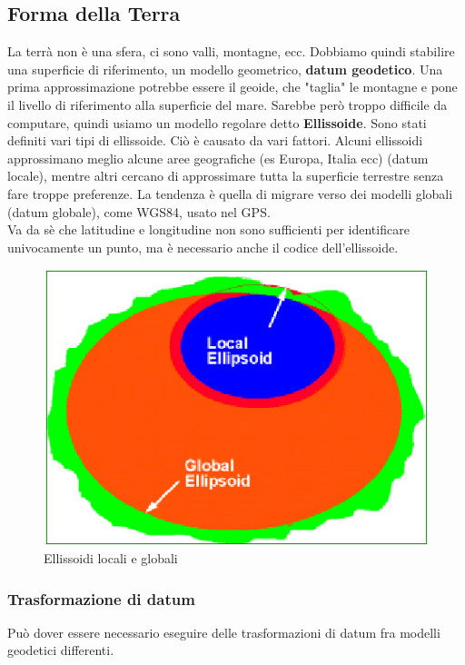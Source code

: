 \documentclass[a4paper,12pt]{article}
\begin{document}
\subsection{Forma della Terra}
La terrà non è una sfera, ci sono valli, montagne, ecc. Dobbiamo quindi stabilire una superficie di riferimento, un modello geometrico, \textbf{datum geodetico}. Una prima approssimazione potrebbe essere il geoide, che "taglia" le montagne e pone il livello di riferimento alla superficie del mare.
Sarebbe però troppo difficile da computare, quindi usiamo un modello regolare detto \textbf{Ellissoide}. Sono stati definiti vari tipi di ellissoide. Ciò è causato da vari fattori. Alcuni ellissoidi approssimano meglio alcune aree geografiche (es Europa, Italia ecc) (datum locale), mentre altri cercano di approssimare tutta la superficie terrestre senza fare troppe preferenze. La tendenza è quella di migrare verso dei modelli globali (datum globale), come WGS84, usato nel GPS.\\
Va da sè che latitudine e longitudine non sono sufficienti per identificare univocamente un punto, ma è necessario anche  il codice dell'ellissoide.

\begin{figure}[H]
	\centering
	\includegraphics[width=.75\linewidth]{Immagini/Elix.png}
	\caption{Ellissoidi locali e globali}
\end{figure}

\subsubsection{Trasformazione di datum}
Può dover essere necessario eseguire delle trasformazioni di datum fra modelli geodetici differenti.
\end{document}
